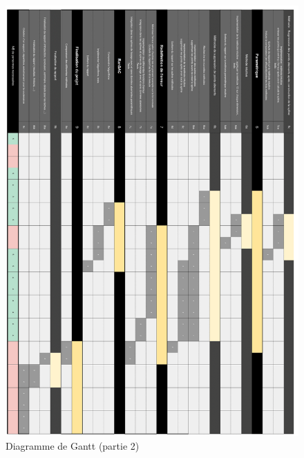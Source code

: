 \documentclass[a4paper,12pt]{article} %
\begin{document}
\begin{figure}
\begin{center}
\includegraphics[width=16cm]{p2.png} 
\end{center}
\caption{Diagramme de Gantt (partie 2)}
\label{DiagG2}
\end{figure}
\end{document}
